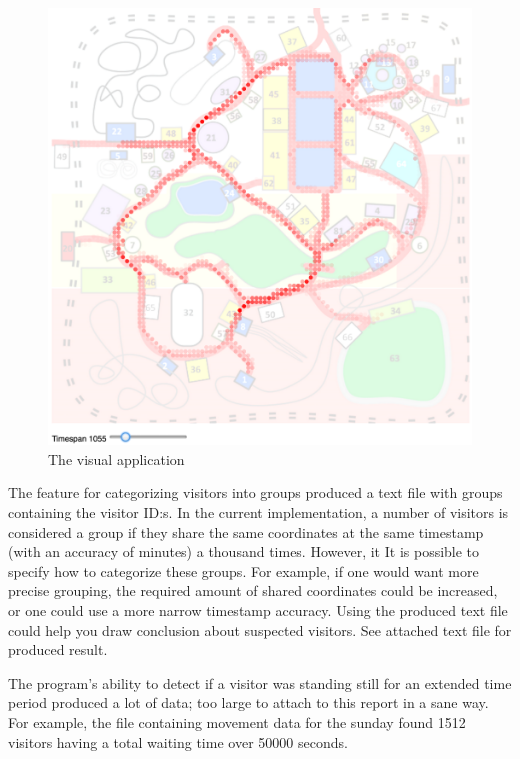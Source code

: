 \documentclass[journal]{vgtc}                %
\begin{document}
\begin{figure}[h!]
  \begin{center}
    \includegraphics[scale=0.4]{img/pic.png}
    \caption{\label{fig:pc}The visual application}

  \end{center}
\end{figure}

The feature for categorizing visitors into groups produced a text file with groups containing  the visitor ID:s. In the current implementation, a number of visitors is considered a group if they share the same coordinates at the same timestamp (with an accuracy of minutes) a thousand times. However, it It is possible to specify how to categorize these groups. For example, if one would want more precise grouping, the required amount of shared coordinates could be increased, or one could use a more narrow timestamp accuracy. Using the produced text file could help you draw conclusion about suspected visitors. See attached text file for produced result.

The program’s ability to detect if a visitor was standing still for an extended time period produced a lot of data; too large to attach to this report in a sane way. For example, the file containing movement data for the sunday found 1512 visitors having a total waiting time over 50000 seconds.
\end{document}
